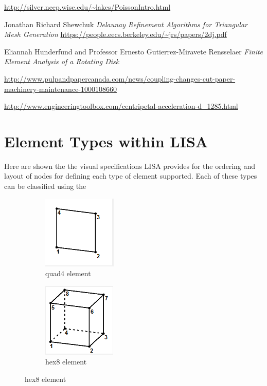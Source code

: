 \begin{changemargin}{\CMwidth}{\CMheight}
\begin{thebibliography}{9}
 \url{http://silver.neep.wisc.edu/~lakes/PoissonIntro.html}

 Jonathan Richard Shewchuk \emph{Delaunay Refinement Algorithms
for Triangular Mesh Generation} \url{https://people.eecs.berkeley.edu/~jrs/papers/2dj.pdf}

 Eliannah Hunderfund and Professor Ernesto Gutierrez-Miravete Rensselaer 
\emph{Finite Element Analysis of a Rotating Disk}


 \url{http://www.pulpandpapercanada.com/news/coupling-changes-cut-paper-machinery-maintenance-1000108660}

 \url{http://www.engineeringtoolbox.com/centripetal-acceleration-d_1285.html}


\end{thebibliography}
\appendix

\section{Element Types within LISA}
Here are shown the the visual specifications LISA provides for the ordering and layout of nodes for defining each type of element supported. Each of these types can be classified using the

\begin{figure}[!h]
\centering
\begin{subfigure}{.5\textwidth}
  \centering
  \includegraphics[width=0.3\linewidth]{../Graphics/LISA-quad4.png}
  \caption{quad4 element}
  \label{fig:sub1}
\end{subfigure}%
\begin{subfigure}{.5\textwidth}
  \centering
  \includegraphics[width=0.3\linewidth]{../Graphics/LISA-hex8.png}
  \caption{hex8 element}
  \label{fig:sub2}
\end{subfigure}
\label{fig:test}
\end{figure}



\end{changemargin}

